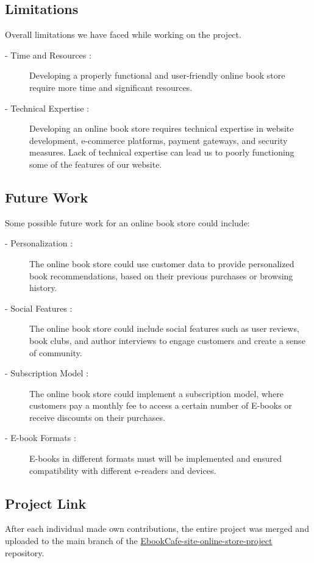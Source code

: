 \documentclass[12pt,a4paper]{article}
\begin{document}
\subsection{Limitations}
Overall limitations we have faced while working on the project.
\begin{description}
    \item[\hspace{7mm}- Time and Resources :] Developing a properly functional and user-friendly online book store require more time and significant resources.
    \item[\hspace{7mm}- Technical Expertise :] Developing an online book store requires technical expertise in website development, e-commerce platforms, payment gateways, and security measures. Lack of technical expertise can lead us to poorly functioning some of the features of our website.
\end{description}
\subsection{Future Work}
Some possible future work for an online book store could include:
\begin{description} 
    \item[\hspace{7mm}- Personalization :] The online book store could use customer data to provide personalized book recommendations, based on their previous purchases or browsing history.
    \item[\hspace{7mm}- Social Features :] The online book store could include social features such as user reviews, book clubs, and author interviews to engage customers and create a sense of community.
    \item[\hspace{7mm}- Subscription Model :] The online book store could implement a subscription model, where customers pay a monthly fee to access a certain number of E-books or receive discounts on their purchases.
    \item[\hspace{7mm}- E-book Formats :] E-books in different formats must will be implemented and ensured compatibility with different e-readers and devices.
\end{description}
\subsection{Project Link}
After each individual made own contributions, the entire project was merged and uploaded to the main branch of the \href{https://github.com/janakmallik/EbookCafe-site-online-store-project}{EbookCafe-site-online-store-project} repository.
\end{document}
